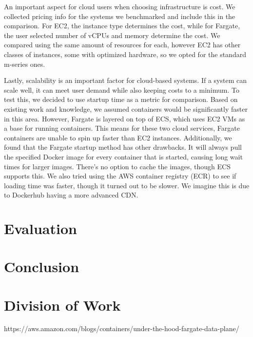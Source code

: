 \documentclass[11pt]{article}
\begin{document}
An important aspect for cloud users when choosing infrastructure is cost. We collected pricing info for the systems we benchmarked and include this in the comparison. For EC2, the instance type determines the cost, while for Fargate, the user selected number of vCPUs and memory determine the cost. We compared using the same amount of resources for each, however EC2 has other classes of instances, some with optimized hardware, so we opted for the standard m-series ones.

Lastly, scalability is an important factor for cloud-based systems. If a system can scale well, it can meet user demand while also keeping costs to a minimum. To test this, we decided to use startup time as a metric for comparison. Based on existing work and knowledge, we assumed containers would be significantly faster in this area. However, Fargate is layered on top of ECS, which uses EC2 VMs as a base for running containers. This means for these two cloud services, Fargate containers are unable to spin up faster than EC2 instances. Additionally, we found that the Fargate startup method has other drawbacks. It will always pull the specified Docker image for every container that is started, causing long wait times for larger images. There's no option to cache the images, though ECS supports this. We also tried using the AWS container registry (ECR) to see if loading time was faster, though it turned out to be slower. We imagine this is due to Dockerhub having a more advanced CDN.

\section{Evaluation}


\section{Conclusion}


\section{Division of Work}



https://aws.amazon.com/blogs/containers/under-the-hood-fargate-data-plane/
\end{document}
